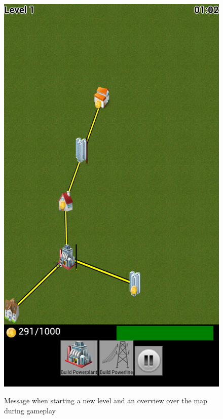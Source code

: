 \begin{figure}[H]
{		\includegraphics[scale=0.18]{pictures/sprint4-screen/mapoverview}
	}
	\caption{Message when starting a new level and an overview over the map during gameplay}
\end{figure}

